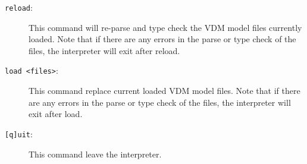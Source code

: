 \documentclass{overturerepchap}
\begin{document}
\begin{description}
\item[\texttt{reload}:] This command will re-parse and type check the
  VDM model files currently loaded. Note that if there are any errors
  in the parse or type check of the files, the interpreter will exit
  after reload. 
\item[\texttt{load <files>}:] This command replace current loaded VDM
  model files. Note that if there are any errors in the parse or type
  check of the files, the interpreter will exit after
  load.  
\item[\texttt{[q]uit}:] This command leave the
  interpreter.  
\end{description}







\end{document}
